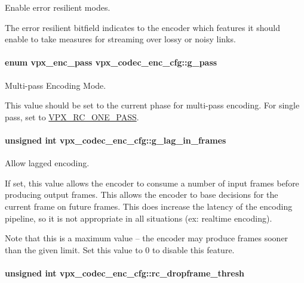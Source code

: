 Enable error resilient modes. 

The error resilient bitfield indicates to the encoder which features it should enable to take measures for streaming over lossy or noisy links. \hypertarget{structvpx__codec__enc__cfg_a70d62d87aae7d1168746577f14a6dccf}{
\paragraph[{g\+\_\+pass}]{\setlength{\rightskip}{0pt plus 5cm}enum {\bf vpx\+\_\+enc\+\_\+pass} vpx\+\_\+codec\+\_\+enc\+\_\+cfg\+::g\+\_\+pass}}\label{structvpx__codec__enc__cfg_a70d62d87aae7d1168746577f14a6dccf}


Multi-\/pass Encoding Mode. 

This value should be set to the current phase for multi-\/pass encoding. For single pass, set to \hyperlink{group__encoder_gga476c5417f9c15a1dc5d3f68fa44c493fa7b6943a41868e8e26a77e9500f139ca1}{V\+P\+X\+\_\+\+R\+C\+\_\+\+O\+N\+E\+\_\+\+P\+A\+S\+S}. \hypertarget{structvpx__codec__enc__cfg_a992668d9e30305f3f7ab2672ea31a890}{
\paragraph[{g\+\_\+lag\+\_\+in\+\_\+frames}]{\setlength{\rightskip}{0pt plus 5cm}unsigned int vpx\+\_\+codec\+\_\+enc\+\_\+cfg\+::g\+\_\+lag\+\_\+in\+\_\+frames}}\label{structvpx__codec__enc__cfg_a992668d9e30305f3f7ab2672ea31a890}


Allow lagged encoding. 

If set, this value allows the encoder to consume a number of input frames before producing output frames. This allows the encoder to base decisions for the current frame on future frames. This does increase the latency of the encoding pipeline, so it is not appropriate in all situations (ex\+: realtime encoding).

Note that this is a maximum value -- the encoder may produce frames sooner than the given limit. Set this value to 0 to disable this feature. \hypertarget{structvpx__codec__enc__cfg_a619269f9a6904de58c4790e6806a3905}{
\paragraph[{rc\+\_\+dropframe\+\_\+thresh}]{\setlength{\rightskip}{0pt plus 5cm}unsigned int vpx\+\_\+codec\+\_\+enc\+\_\+cfg\+::rc\+\_\+dropframe\+\_\+thresh}}\label{structvpx__codec__enc__cfg_a619269f9a6904de58c4790e6806a3905}


